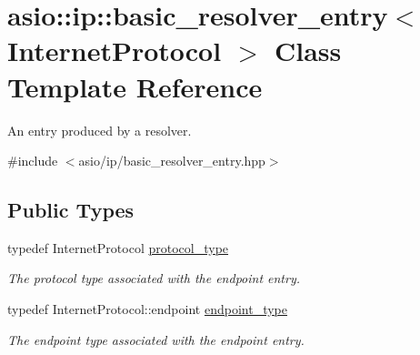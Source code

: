 \hypertarget{classasio_1_1ip_1_1basic__resolver__entry}{}\section{asio\+:\+:ip\+:\+:basic\+\_\+resolver\+\_\+entry$<$ Internet\+Protocol $>$ Class Template Reference}
\label{classasio_1_1ip_1_1basic__resolver__entry}


An entry produced by a resolver.  




{\ttfamily \#include $<$asio/ip/basic\+\_\+resolver\+\_\+entry.\+hpp$>$}

\subsection*{Public Types}
\begin{DoxyCompactItemize}
\item 
typedef Internet\+Protocol \hyperlink{classasio_1_1ip_1_1basic__resolver__entry_ae391844bc3cacf20820b4090a1389a44}{protocol\+\_\+type}
\begin{DoxyCompactList}\small\item\em The protocol type associated with the endpoint entry. \end{DoxyCompactList}\item 
typedef Internet\+Protocol\+::endpoint \hyperlink{classasio_1_1ip_1_1basic__resolver__entry_ad0d9f222f3a4897afa941c35e1a90074}{endpoint\+\_\+type}
\begin{DoxyCompactList}\small\item\em The endpoint type associated with the endpoint entry. \end{DoxyCompactList}\end{DoxyCompactItemize}
